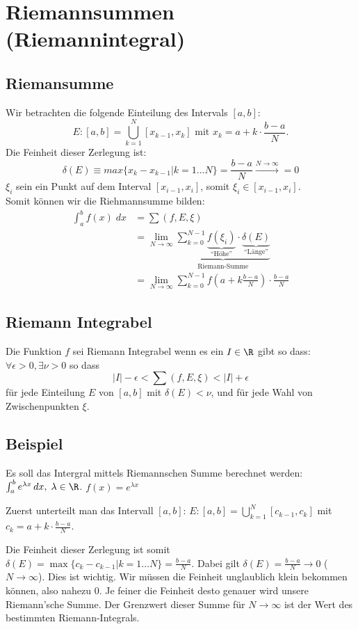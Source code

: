 \section{Riemannsummen (Riemannintegral)}
\subsection{Riemansumme}
Wir betrachten die folgende Einteilung des Intervals $[a,b]$:\[
E: [a,b] = \bigcup_{k=1}^{N}[x_{k-1}, x_k] \text{ mit } x_k = a + k \cdot \frac{b-a}{N}.
\]
Die Feinheit dieser Zerlegung ist:\[
\delta(E) \equiv max\{x_k - x_{k-1}|k = 1...N\} = \frac{b-a}{N} \xrightarrow{N \to \infty} = 0
\]
$\xi_i$ sein ein Punkt auf dem Interval $[x_{i-1}, x_i]$, somit $\xi_i \in[x_{i-1}, x_i]$.\\
Somit können wir die Riehmannsumme bilden:
\begin{align*}
\int_a^b f(x)\;dx &=\sum (f,E,\xi)\\
&= \lim_{N \to \infty} \underbrace{\sum_{k=0}^{N-1}
\underbrace{f(\xi_i)}_{\text{``Höhe''}} \cdot
\underbrace{\delta(E)}_{\text{``Länge''}}}_{\text{Riemann-Summe}}\\
&= \lim_{N \to \infty} \sum_{k=0}^{N-1} {f(a +
k\frac{b-a}{N})} \cdot \frac{b-a}{N}
\end{align*}
\subsection{Riemann Integrabel}
Die Funktion $f$ sei Riemann Integrabel wenn es ein $I \in \R$ gibt so dass: $\forall \epsilon > 0, \exists \nu > 0$ so dass \[
|I| - \epsilon < \sum (f,E,\xi) < |I| + \epsilon
\]
für jede Einteilung $E$ von $[a,b]$ mit $\delta(E) < \nu$, und für jede Wahl von Zwischenpunkten $\xi$.

\subsection{Beispiel}
Es soll das Intergral mittels Riemannschen Summe berechnet werden: $\int_a^b
e^{\lambda x}\,dx, \; \lambda \in \R$. $f(x) = e^{\lambda x}$

Zuerst unterteilt man das Intervall $[a,b]$: $E: [a,b] =
\bigcup_{k=1}^N[c_{k-1}, c_k]$ mit $c_k = a + k\cdot \frac{b-a}{N}$.

Die Feinheit dieser Zerlegung ist somit $\delta(E) = \max\{c_k - c_{k-1} | k =
1 \ldots N\} = \frac{b-a}{N}$. Dabei gilt $\delta(E) = \frac{b-a}{N} \to 0$ ($N
\to \infty$). Dies ist wichtig. Wir müssen die Feinheit unglaublich klein
bekommen können, also nahezu $0$. Je feiner die Feinheit desto genauer wird
unsere Riemann'sche Summe. Der Grenzwert dieser Summe für $N \to \infty$ ist der
Wert des bestimmten Riemann-Integrals.

